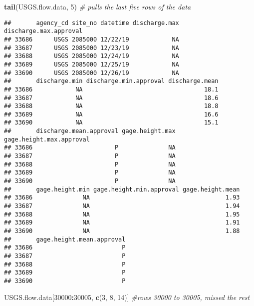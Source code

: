 \documentclass[]{article}
\newenvironment{Shaded}{\begin{snugshade}}{\end{snugshade}}
\newcommand{\CommentTok}[1]{\textcolor[rgb]{0.56,0.35,0.01}{\textit{#1}}}
\newcommand{\DecValTok}[1]{\textcolor[rgb]{0.00,0.00,0.81}{#1}}
\newcommand{\KeywordTok}[1]{\textcolor[rgb]{0.13,0.29,0.53}{\textbf{#1}}}
\newcommand{\NormalTok}[1]{#1}
\newcommand{\OperatorTok}[1]{\textcolor[rgb]{0.81,0.36,0.00}{\textbf{#1}}}
\begin{document}
\begin{Shaded}
\begin{Highlighting}[]
\KeywordTok{tail}\NormalTok{(USGS.flow.data, }\DecValTok{5}\NormalTok{) }\CommentTok{# pulls the last five rows of the data }
\end{Highlighting}
\end{Shaded}

\begin{verbatim}
##       agency_cd site_no datetime discharge.max discharge.max.approval
## 33686      USGS 2085000 12/22/19            NA                       
## 33687      USGS 2085000 12/23/19            NA                       
## 33688      USGS 2085000 12/24/19            NA                       
## 33689      USGS 2085000 12/25/19            NA                       
## 33690      USGS 2085000 12/26/19            NA                       
##       discharge.min discharge.min.approval discharge.mean
## 33686            NA                                  18.1
## 33687            NA                                  18.6
## 33688            NA                                  18.8
## 33689            NA                                  16.6
## 33690            NA                                  15.1
##       discharge.mean.approval gage.height.max gage.height.max.approval
## 33686                       P              NA                         
## 33687                       P              NA                         
## 33688                       P              NA                         
## 33689                       P              NA                         
## 33690                       P              NA                         
##       gage.height.min gage.height.min.approval gage.height.mean
## 33686              NA                                      1.93
## 33687              NA                                      1.94
## 33688              NA                                      1.95
## 33689              NA                                      1.91
## 33690              NA                                      1.88
##       gage.height.mean.approval
## 33686                         P
## 33687                         P
## 33688                         P
## 33689                         P
## 33690                         P
\end{verbatim}

\begin{Shaded}
\begin{Highlighting}[]
\NormalTok{USGS.flow.data[}\DecValTok{30000}\OperatorTok{:}\DecValTok{30005}\NormalTok{, }\KeywordTok{c}\NormalTok{(}\DecValTok{3}\NormalTok{, }\DecValTok{8}\NormalTok{, }\DecValTok{14}\NormalTok{)] }\CommentTok{#rows 30000 to 30005, missed the rest }
\end{Highlighting}
\end{Shaded}
\end{document}
